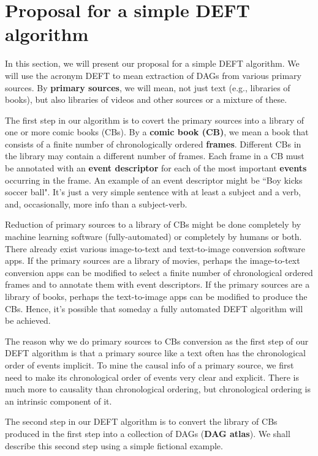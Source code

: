 \documentclass[12pt]{article}
\begin{document}
\section{Proposal for
a simple DEFT algorithm}

In this section,
we will present 
our proposal
for a simple DEFT
algorithm.
We will
use the acronym 
DEFT to mean extraction
of DAGs
from various primary sources.
By {\bf primary sources},
we will
mean, not
just text (e.g., libraries of
books),
but also libraries of videos
and other sources or
a mixture of these.

The first step in
our algorithm
is to covert 
the primary sources
into a library
of one or more comic books (CBs).
By a {\bf comic book (CB)},
we mean
a book that
consists of 
a finite number
of chronologically 
ordered {\bf frames}.
Different CBs 
in the 
library may
contain a different
number of frames.
Each frame in a CB
must be annotated
with an {\bf event descriptor}
for each of
the most important {\bf events}
occurring in the frame.
An example
of an event descriptor
might be ``Boy kicks soccer ball".
It's just a very simple sentence
with at least a subject and a verb,
and, occasionally, 
more info than a subject-verb.

Reduction of primary
sources to a library of CBs
might be
done completely
by machine learning
software (fully-automated)
or completely by humans
or both.
There already
exist various 
image-to-text and text-to-image
conversion
software apps.
If the
primary sources
are a library of
movies,
perhaps the
image-to-text
conversion
apps can be
modified to
select 
a finite number
of chronological ordered frames and 
to annotate them
with event descriptors.
If the primary sources are 
a library of books,
perhaps
the text-to-image
apps  can be modified 
to produce the CBs.
Hence, it's possible that 
someday a fully automated
DEFT algorithm will 
be achieved.

The
reason
why we  do primary 
sources to CBs
conversion
as the 
first step
of our DEFT
algorithm
is that
a primary 
source like a
text often
has
the chronological
order of events
implicit.
To mine
the causal
info of a primary
source, we first need to 
make its chronological
order of events 
very clear and explicit.
There is much more
to causality than chronological
ordering,
but chronological 
ordering is an intrinsic
component of it.

The second step
in our DEFT
algorithm 
is to convert
the 
library of CBs
produced in the first step
into a collection of DAGs
({\bf DAG atlas}). We shall
describe this second step
using a simple fictional
example.
\end{document}
